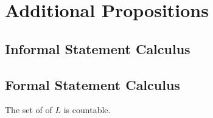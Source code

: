\appendix

\chapter{Additional Propositions}

\section*{Informal Statement Calculus}

\section*{Formal Statement Calculus}

\begin{proposition}
  The set of \wfs{} of \(L\) is countable.
\end{proposition}
